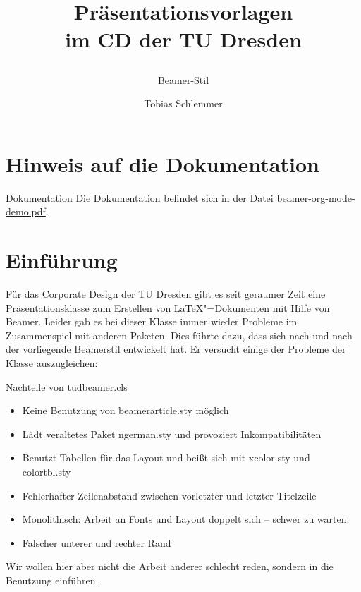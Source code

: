 \usepackage{xcolor}
\usepackage{listings}
\title{Präsentationsvorlagen\protect\\\mdseries im CD der TU Dresden\strut}
\subtitle{Beamer-Stil}
\author{Tobias Schlemmer}

\maketitle
\section{Hinweis auf die Dokumentation}
\begin{frame}{Dokumentation}
  Die Dokumentation befindet sich in der Datei
  \url{beamer-org-mode-demo.pdf}.
\end{frame}
\frame{\tableofcontents}
\section{Einführung}
\begin{frame}

Für das Corporate Design der TU Dresden gibt es seit geraumer Zeit eine Präsentationsklasse zum Erstellen von \LaTeX{}"=Dokumenten mit Hilfe von Beamer. Leider gab es bei dieser Klasse immer wieder Probleme im Zusammenspiel mit anderen Paketen. Dies führte dazu, dass sich nach und nach der vorliegende Beamerstil entwickelt hat. Er versucht einige der Probleme der Klasse auszugleichen:
\end{frame}
\begin{frame}
  \begin{block}{Nachteile von tudbeamer.cls}
    \begin{itemize}
    \item Keine Benutzung von beamerarticle.sty möglich
    \item Lädt veraltetes Paket ngerman.sty und provoziert Inkompatibilitäten
    \item Benutzt Tabellen für das Layout und beißt sich mit xcolor.sty und colortbl.sty
    \item Fehlerhafter Zeilenabstand zwischen vorletzter und letzter Titelzeile
    \item Monolithisch: Arbeit an Fonts und Layout doppelt sich – schwer zu warten.
    \item Falscher unterer und rechter Rand
    \end{itemize}
  \end{block}
  Wir wollen hier aber nicht die Arbeit anderer schlecht reden, sondern in die Benutzung einführen.
\end{frame}


